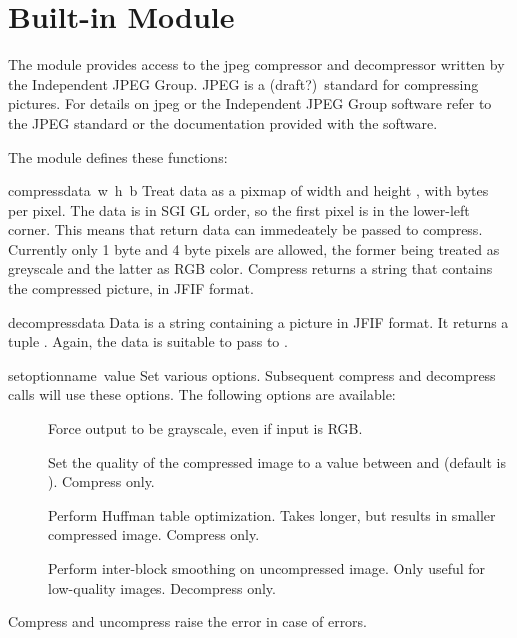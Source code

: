 \section{Built-in Module }

The module  provides access to the jpeg compressor and
decompressor written by the Independent JPEG Group. JPEG is a (draft?)\
standard for compressing pictures.  For details on jpeg or the
Independent JPEG Group software refer to the JPEG standard or the
documentation provided with the software.

The  module defines these functions:

\renewcommand{\indexsubitem}{(in module jpeg)}
\begin{funcdesc}{compress}{data\, w\, h\, b}
Treat data as a pixmap of width  and height , with  bytes per
pixel.  The data is in SGI GL order, so the first pixel is in the
lower-left corner. This means that \code{lrectread} return data can
immedeately be passed to compress.  Currently only 1 byte and 4 byte
pixels are allowed, the former being treated as greyscale and the
latter as RGB color.  Compress returns a string that contains the
compressed picture, in JFIF format.
\end{funcdesc}

\begin{funcdesc}{decompress}{data}
Data is a string containing a picture in JFIF format. It returns a
tuple
.
Again, the data is suitable to pass to \code{lrectwrite}.
\end{funcdesc}

\begin{funcdesc}{setoption}{name\, value}
Set various options.  Subsequent compress and decompress calls
will use these options.  The following options are available:
\begin{description}
\item[]
Force output to be grayscale, even if input is RGB.

\item[]
Set the quality of the compressed image to a
value between  and  (default is ).  Compress only.

\item[]
Perform Huffman table optimization.  Takes longer, but results in
smaller compressed image.  Compress only.

\item[]
Perform inter-block smoothing on uncompressed image.  Only useful for
low-quality images.  Decompress only.
\end{description}
\end{funcdesc}

Compress and uncompress raise the error  in case of errors.
